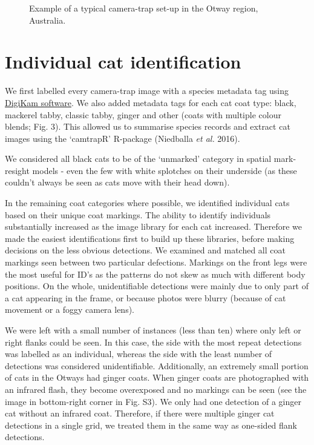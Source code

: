 \documentclass[11pt,a4paper,titlepage,twoside,openright]{style/unimelbthesis}
\begin{document}
\begin{mainmatter}
\begin{figure}
{}

\caption{Example of a typical camera-trap set-up in the Otway region, Australia.}\label{fig:density-cam-photo}
\end{figure}
\newpage

\hypertarget{density-app-id}{%
\section{Individual cat identification}\label{density-app-id}}

We first labelled every camera-trap image with a species metadata tag using \href{https://www.digikam.org}{DigiKam software}. We also added metadata tags for each cat coat type: black, mackerel tabby, classic tabby, ginger and other (coats with multiple colour blends; Fig. 3). This allowed us to summarise species records and extract cat images using the `camtrapR' R-package (Niedballa \emph{et al.} 2016).

We considered all black cats to be of the `unmarked' category in spatial mark-resight models - even the few with white splotches on their underside (as these couldn't always be seen as cats move with their head down).

In the remaining coat categories where possible, we identified individual cats based on their unique coat markings. The ability to identify individuals substantially increased as the image library for each cat increased. Therefore we made the easiest identifications first to build up these libraries, before making decisions on the less obvious detections. We examined and matched all coat markings seen between two particular defections. Markings on the front legs were the most useful for ID's as the patterns do not skew as much with different body positions. On the whole, unidentifiable detections were mainly due to only part of a cat appearing in the frame, or because photos were blurry (because of cat movement or a foggy camera lens).

We were left with a small number of instances (less than ten) where only left or right flanks could be seen. In this case, the side with the most repeat detections was labelled as an individual, whereas the side with the least number of detections was considered unidentifiable. Additionally, an extremely small portion of cats in the Otways had ginger coats. When ginger coats are photographed with an infrared flash, they become overexposed and no markings can be seen (see the image in bottom-right corner in Fig. S3). We only had one detection of a ginger cat without an infrared coat. Therefore, if there were multiple ginger cat detections in a single grid, we treated them in the same way as one-sided flank detections.


\end{mainmatter}
\end{document}

